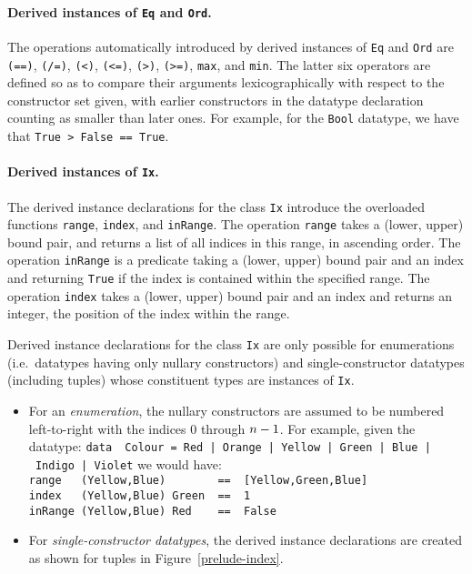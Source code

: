 \paragraph*{Derived instances of \mbox{\tt Eq} and \mbox{\tt Ord}.}
The operations automatically introduced by derived instances
of \mbox{\tt Eq} and \mbox{\tt Ord} are \mbox{\tt (==)}\indextt{==}, \mbox{\tt (/=)}\indextt{/=},
\mbox{\tt (<)}\indextt{<}, \mbox{\tt (<=)}\indextt{<=}, \mbox{\tt (>)}\indextt{>},
\mbox{\tt (>=)}\indextt{>=}, \mbox{\tt max}, and 
\mbox{\tt min}.  The latter six operators are defined so
as to compare their arguments lexicographically with respect to
the constructor set given, with earlier constructors in the datatype
declaration counting as smaller than later ones.  For example, for the
\mbox{\tt Bool} datatype, we have that \mbox{\tt True\ >\ False\ ==\ True}.

\paragraph*{Derived instances of \mbox{\tt Ix}.}
The derived instance declarations for the class \mbox{\tt Ix}
introduce the overloaded functions
\mbox{\tt range}, \mbox{\tt index}, and
\mbox{\tt inRange}.  The operation \mbox{\tt range} takes a (lower,
upper) bound pair, and returns a list of all indices in this range, in
ascending order.  The operation \mbox{\tt inRange} is a predicate taking a
(lower, upper) bound pair and an index and returning \mbox{\tt True} if the
index is contained within the specified range.  The operation \mbox{\tt index}
takes a (lower, upper) bound pair and an index and returns an integer,
the position of the index within the range.

Derived instance declarations for the class \mbox{\tt Ix} are only possible
for enumerations (i.e.~datatypes having
only nullary constructors) and single-constructor datatypes
(including tuples) whose constituent types are instances of \mbox{\tt Ix}.  
\begin{itemize}
\item
For an {\em enumeration}, the nullary constructors are assumed to be
numbered left-to-right with the indices 0 through $n-1\/$.  For example,
given the datatype:
\bprog
\mbox{\tt data\ \ Colour\ =\ Red\ |\ Orange\ |\ Yellow\ |\ Green\ |\ Blue\ |\ Indigo\ |\ Violet}
\eprog
we would have:
\bprog
\mbox{\tt range\ \ \ (Yellow,Blue)\ \ \ \ \ \ \ \ ==\ \ [Yellow,Green,Blue]}\\
\mbox{\tt index\ \ \ (Yellow,Blue)\ Green\ \ ==\ \ 1}\\
\mbox{\tt inRange\ (Yellow,Blue)\ Red\ \ \ \ ==\ \ False}
\eprog
\item
For {\em single-constructor datatypes}, the derived instance declarations
are created as shown for tuples in
Figure~\ref{prelude-index}.
\end{itemize}

